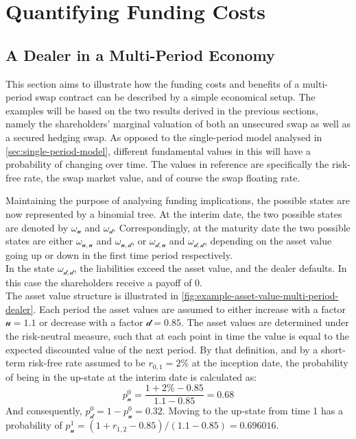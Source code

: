 \documentclass[main.tex]{subfiles}
\begin{document}
    \section{Quantifying Funding Costs}
    \subsection{A Dealer in a Multi-Period Economy}
    \label{sec:swap-examples}
        This section aims to illustrate
        how the funding costs and benefits of a multi-period swap contract
        can be described by a simple economical setup.
        The examples will be based on the two results derived in the previous sections,
        namely the shareholders' marginal valuation of both an unsecured swap as well as a secured hedging swap.
        As opposed to the single-period model analysed in \cref{sec:single-period-model},
        different fundamental values in this  will have a probability of changing over time.
        The values in reference are specifically
        the risk-free rate,
        the swap market value,
        and of course the swap floating rate.
        
        Maintaining the purpose of analysing funding implications,
        the possible states are now represented by a binomial tree.
        At the interim date, the two possible states are denoted by $\omega_\mathscr{u}$ and $\omega_\mathscr{d}$.
        Correspondingly, at the maturity date the two possible states are either
        $\omega_{\mathscr{u},\mathscr{u}}$ and $\omega_{\mathscr{u},\mathscr{d}}$,
        or $\omega_{\mathscr{d},\mathscr{u}}$ and $\omega_{\mathscr{d},\mathscr{d}}$,
        depending on the asset value going up or down in the first time period respectively.
        \\
        In the state $\omega_{\mathscr{d},\mathscr{d}}$, the liabilities exceed the asset value,
        and the dealer defaults.
        In this case the shareholders receive a payoff of 0.
        \\
        The asset value structure is illustrated in 
        \cref{fig:example-asset-value-multi-period-dealer}.
        Each period the asset values are assumed to either increase with a factor $\mathscr{u} = 1.1$
        or decrease with a factor $\mathscr{d} = 0.85$.
        The asset values are determined under the risk-neutral measure,
        such that at each point in time the value is equal to the expected discounted value of the next period.
        By that definition, and by a short-term risk-free rate assumed to be $r_{0,1}=2\%$ at the inception date,
        the probability of being in the up-state at the interim date is calculated as:
        \begin{equation*}
            p_{\mathscr{u}}^{0} =
            \frac{
                1 + 2\% - 0.85
            }{
                1.1 - 0.85
            }
            = \num{0.68}
        \end{equation*}
        And consequently, $p_{\mathscr{d}}^{0} = 1 - p_{\mathscr{u}}^{0} = \num{0.32}$.
        Moving to the up-state from time 1 has a probability of
        $p^1_\mathscr{u}=(1+r_{1,2}-0.85)/(1.1-0.85) = \num{0.696016}$.
\end{document}
